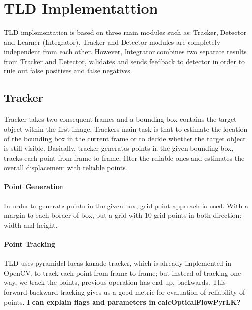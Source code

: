 \documentclass{article}
\begin{document}
    \section{TLD Implementattion}
        \paragraph{}
            TLD implementation is based on three main modules such as: Tracker, Detector and Learner (Integrator).
            Tracker and Detector modules are completely independent from each other.
            However, Integrator combines two separate results from Tracker and Detector, validates and
            sends feedback to detector in order to rule out false positives and false negatives.
        \subsection{Tracker}
            \paragraph{}
                Tracker takes two consequent frames and a bounding box contains the target object within the first image.
                Trackers main task is that to estimate the location of the bounding box in the current frame or to decide whether the
                target object is still visible. Basically, tracker generates points in the given bounding box,
                tracks each point from frame to frame, filter the reliable ones and estimates the overall displacement
                with reliable points.
            \paragraph{Point Generation}
                In order to generate points in the given box, grid point approach is used. With a margin to each border of box,
                put a grid with 10 grid points in both direction: width and height.
            \paragraph{Point Tracking}
                TLD uses pyramidal lucas-kanade tracker, which is already implemented in OpenCV, to track each point from frame
                to frame; but instead of tracking one way, we track the points, previous operation has end up, backwards.
                This forward-backward tracking gives us a good metric for evaluation of reliability of points.
                \textbf{I can explain flags and parameters in calcOpticalFlowPyrLK?}
\end{document}
